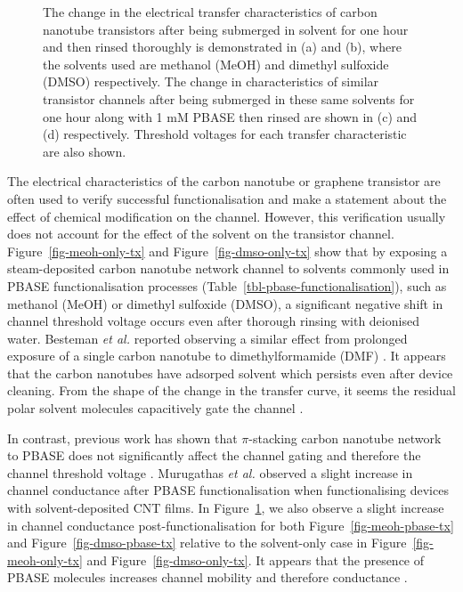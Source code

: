 \documentclass[
  a4paper,
]{scrbook}
\begin{document}
\begin{figure}
\begin{minipage}[t]{0.50\linewidth}
{{}

}

\subcaption{\label{fig-dmso-pbase-tx}}
\end{minipage}%

\caption{\label{fig-PBASE-vs-solvent-only}The change in the electrical
transfer characteristics of carbon nanotube transistors after being
submerged in solvent for one hour and then rinsed thoroughly is
demonstrated in (a) and (b), where the solvents used are methanol (MeOH)
and dimethyl sulfoxide (DMSO) respectively. The change in
characteristics of similar transistor channels after being submerged in
these same solvents for one hour along with 1 mM PBASE then rinsed are
shown in (c) and (d) respectively. Threshold voltages for each transfer
characteristic are also shown.}

\end{figure}

The electrical characteristics of the carbon nanotube or graphene
transistor are often used to verify successful functionalisation and
make a statement about the effect of chemical modification on the
channel. However, this verification usually does not account for the
effect of the solvent on the transistor channel.
Figure~\ref{fig-meoh-only-tx} and Figure~\ref{fig-dmso-only-tx} show
that by exposing a steam-deposited carbon nanotube network channel to
solvents commonly used in PBASE functionalisation processes
(Table~\ref{tbl-pbase-functionalisation}), such as methanol (MeOH) or
dimethyl sulfoxide (DMSO), a significant negative shift in channel
threshold voltage occurs even after thorough rinsing with deionised
water. Besteman \emph{et al.} reported observing a similar effect from
prolonged exposure of a single carbon nanotube to dimethylformamide
(DMF) \autocite{Besteman2003}. It appears that the carbon nanotubes have
adsorped solvent which persists even after device cleaning. From the
shape of the change in the transfer curve, it seems the residual polar
solvent molecules capacitively gate the channel
\autocite{Artyukhin2006,Heller2008}.

In contrast, previous work has shown that \(\pi\)-stacking carbon
nanotube network to PBASE does not significantly affect the channel
gating and therefore the channel threshold voltage
\autocite{Besteman2003,Murugathas2019b}. Murugathas \emph{et al.}
observed a slight increase in channel conductance after PBASE
functionalisation when functionalising devices with solvent-deposited
CNT films. In Figure~\ref{fig-PBASE-vs-solvent-only}, we also observe a
slight increase in channel conductance post-functionalisation for both
Figure~\ref{fig-meoh-pbase-tx} and Figure~\ref{fig-dmso-pbase-tx}
relative to the solvent-only case in Figure~\ref{fig-meoh-only-tx} and
Figure~\ref{fig-dmso-only-tx}. It appears that the presence of PBASE
molecules increases channel mobility and therefore conductance
\autocite{Heller2008}.
\end{document}
